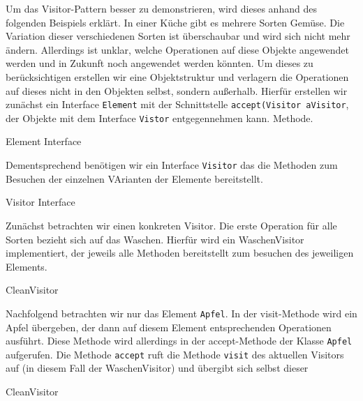 
Um das Visitor-Pattern besser zu demonstrieren, wird dieses anhand des folgenden Beispiels erklärt. In einer Küche gibt es mehrere Sorten Gemüse. Die Variation dieser verschiedenen Sorten ist überschaubar und wird sich nicht mehr ändern. Allerdings ist unklar, welche Operationen auf diese Objekte angewendet werden und in Zukunft noch angewendet werden könnten. Um dieses zu berücksichtigen erstellen wir eine Objektstruktur und verlagern die Operationen auf dieses nicht in den Objekten selbst, sondern außerhalb. Hierfür erstellen wir zunächst ein Interface \texttt{Element} mit der Schnittstelle \texttt{accept(Visitor aVisitor}, der Objekte mit dem Interface \texttt{Vistor} entgegennehmen kann.  Methode.


\begin{listing}[h!]
   \centering
   \caption{Element Interface}
    \label{visitor_element_interface}
\end{listing}  


Dementsprechend benötigen wir ein Interface \texttt{Visitor} das die Methoden zum Besuchen der einzelnen VArianten der Elemente bereitstellt.

\begin{listing}[h!]
   \centering
   \caption{Visitor Interface}
    \label{visitor_visitor_interface}
\end{listing}  

 
Zunächst betrachten wir einen konkreten Visitor. Die erste Operation für alle Sorten bezieht sich auf das Waschen. Hierfür wird ein WaschenVisitor implementiert, der jeweils alle Methoden bereitstellt zum besuchen des jeweiligen Elements. 

\begin{listing}[h!]
   \centering
   \caption{CleanVisitor}
    \label{visitor_cleanvisitor}
\end{listing}  


Nachfolgend betrachten wir nur das Element \texttt{Apfel}. In der visit-Methode wird ein Apfel übergeben, der dann auf diesem Element entsprechenden Operationen ausführt.
Diese Methode wird allerdings in der accept-Methode der Klasse \texttt{Apfel} aufgerufen. Die Methode \texttt{accept} ruft die Methode \texttt{visit} des aktuellen Visitors auf (in diesem Fall der WaschenVisitor) und übergibt sich selbst dieser


\begin{listing}[h!]
   \centering
   \caption{CleanVisitor}
    \label{visitor_potato}
\end{listing}  


